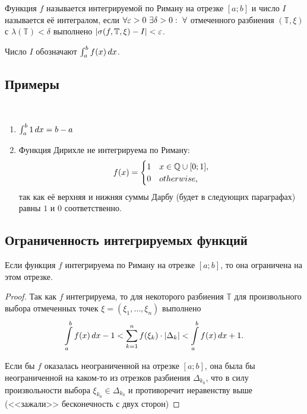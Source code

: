 \documentclass[a4paper]{article}
\theoremstyle{named}
\newcommand{\T}{\mathbb{T}}
\renewcommand{\int}{\intop}
\begin{document}
        \begin{definition*}
            Функция $f$ называется интегрируемой по Риману на отрезке $[a; b]$ и число $I$ называется её интегралом, если $\forall \varepsilon > 0 \ \exists \delta > 0: \ \forall$ отмеченного разбиения $(\T, \xi)$ с $\lambda(\T) < \delta$ выполнено $|\sigma(f, \T, \xi) - I| < \eps$.

            Число $I$ обозначают $\int_a^b f(x) \dd x$.
        \end{definition*}

        \subsection{Примеры}

        \begin{example*}~

            \begin{enumerate}
            \item
                $\int_a^b 1 \dd x = b - a$

            \item
                Функция Дирихле не интегрируема по Риману:
                \begin{equation*}
                	f(x) = \begin{cases}
                		1 &x \in \mathbb{Q} \cup [0; 1], \\
                		0 &otherwise,
                	\end{cases}
                \end{equation*}
                так как её верхняя и нижняя суммы Дарбу (будет в следующих параграфах) равны $1$ и $0$ соответственно.
            \end{enumerate}
        \end{example*}

        \subsection{Ограниченность интегрируемых функций}

        \begin{proposal*}
            Если функция $f$ интегрируема по Риману на отрезке $[a; b]$, то она ограничена на этом отрезке.
        \end{proposal*}

        \begin{proof}
            Так как $f$ интегрируема, то для некоторого разбиения $\T$ для произвольного выбора отмеченных точек $\xi = (\xi_1, \dots, \xi_n)$ выполнено
            \begin{equation*}
                \int_a^b f(x) \dd x - 1 < \sum_{k = 1}^n f(\xi_k) \cdot |\Delta_k| < \int_a^b f(x) \dd x + 1.
            \end{equation*}

            Если бы $f$ оказалась неограниченной на отрезке $[a; b]$, она была бы неограниченной на каком-то из отрезков разбиения $\Delta_{k_0}$, что в силу произвольности выбора $\xi_{k_0} \in \Delta_{k_0}$ и противоречит неравенству выше (<<зажали>> бесконечность с двух сторон)
        \end{proof}
\end{document}
